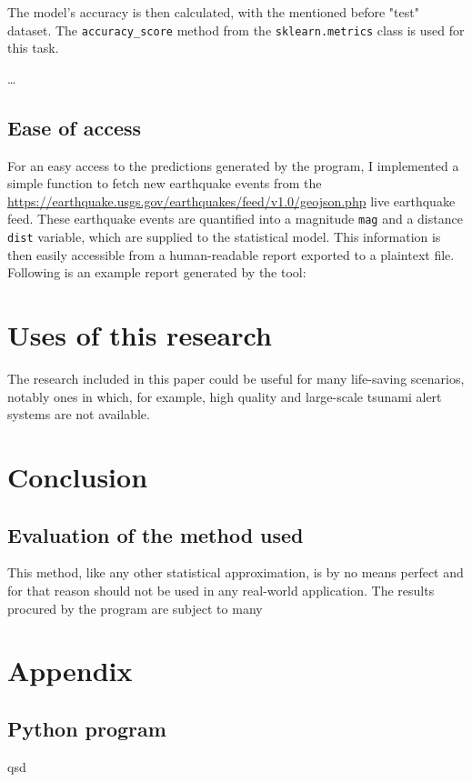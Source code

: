 \documentclass[11pt,letterpaper]{article}
\begin{document}
The model's accuracy is then calculated, with the mentioned before "test" dataset. 
The \verb|accuracy_score| method from the \verb|sklearn.metrics| class is used for this 
task. 

\dots



\subsection{Ease of access}
For an easy access to the predictions generated by the program, I implemented 
a simple function to fetch new earthquake events from the \url{https://earthquake.usgs.gov/earthquakes/feed/v1.0/geojson.php} 
live earthquake feed. These earthquake events are quantified into a magnitude \verb|mag| 
and a distance \verb|dist| variable, which are supplied to the statistical model. 
This information is then easily accessible from a human-readable report exported 
to a plaintext file. Following is an example report generated by the tool: 

\section{Uses of this research}

The research included in this paper could be useful for many life-saving scenarios, 
notably ones in which, for example, high quality and large-scale tsunami alert 
systems are not available. 

\section{Conclusion}

\subsection{Evaluation of the method used}

This method, like any other statistical approximation, is by no means perfect 
and for that reason should not be used in any real-world application. The results 
procured by the program are subject to many 

\printbibliography[heading=bibintoc, title=Works Cited]

\appendix
\section{Appendix}
\label{app}
\subsection{Python program}
\label{app:scripts}
qsd

\end{document}
